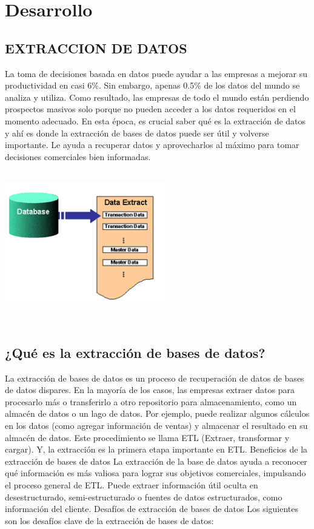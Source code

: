 \documentclass[twoside,twocolumn]{article}
\begin{document}
\section{Desarrollo}

\subsection{EXTRACCION DE DATOS }

La toma de decisiones basada en datos puede ayudar a las empresas a mejorar 
su productividad en casi 6\%.
 Sin embargo, apenas 0.5\% de los datos del mundo se analiza y utiliza. Como 
 resultado, las empresas de todo el mundo están perdiendo prospectos masivos solo
  porque no pueden acceder a los datos requeridos en el momento adecuado. En esta 
  época, es crucial saber qué es la extracción de datos y ahí es donde la extracción 
  de bases de datos puede ser útil y volverse importante. Le ayuda a recuperar datos 
  y aprovecharlos al máximo para tomar decisiones comerciales bien informadas. 
  \includegraphics[width=7cm, height=7cm]{imagenes/1.png}


   
\subsection{¿Qué es la extracción de bases de datos?}

La extracción de bases de datos es un proceso de recuperación de datos de bases de datos dispares. En la mayoría de los casos, las empresas extraer datos para procesarlo más o transferirlo a otro repositorio para almacenamiento, como un almacén de datos o un lago de datos.
Por ejemplo, puede realizar algunos cálculos en los datos (como agregar información de ventas) y almacenar el resultado en su almacén de datos. Este procedimiento se llama ETL (Extraer, transformar y cargar). Y, la extracción es la primera etapa importante en ETL.
Beneficios de la extracción de bases de datos
La extracción de la base de datos ayuda a reconocer qué información es más valiosa para lograr sus objetivos comerciales, impulsando el proceso general de ETL. Puede extraer información útil oculta en desestructurado, semi-estructurado o fuentes de datos estructurados, como información del cliente.
Desafíos de extracción de bases de datos
Los siguientes son los desafíos clave de la extracción de bases de datos:
\end{document}

